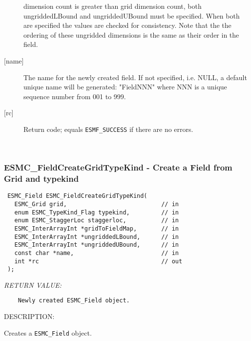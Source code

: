 \begin{description}
      dimension count is greater than grid dimension count, both ungriddedLBound and
      ungriddedUBound must be specified. When both are specified the values are
      checked for consistency. Note that the the ordering of these ungridded
      dimensions is the same as their order in the field.  
    \item[{[name]}]
      The name for the newly created field.  If not specified, i.e. NULL,
      a default unique name will be generated: "FieldNNN" where NNN
      is a unique sequence number from 001 to 999.
    \item[{[rc]}]
      Return code; equals {\tt ESMF\_SUCCESS} if there are no errors.
    \end{description}
   
 
\mbox{}\hrulefill\ 
 
\subsubsection [ESMC\_FieldCreateGridTypeKind] {ESMC\_FieldCreateGridTypeKind - Create a Field from Grid and typekind}


  
\begin{verbatim} ESMC_Field ESMC_FieldCreateGridTypeKind(
   ESMC_Grid grid,                           // in
   enum ESMC_TypeKind_Flag typekind,         // in
   enum ESMC_StaggerLoc staggerloc,          // in
   ESMC_InterArrayInt *gridToFieldMap,       // in
   ESMC_InterArrayInt *ungriddedLBound,      // in
   ESMC_InterArrayInt *ungriddedUBound,      // in
   const char *name,                         // in
   int *rc                                   // out
 );
 \end{verbatim}{\em RETURN VALUE:}
\begin{verbatim}    Newly created ESMC_Field object.\end{verbatim}
{\sf DESCRIPTION:\\ }


  
    Creates a {\tt ESMC\_Field} object.
  
